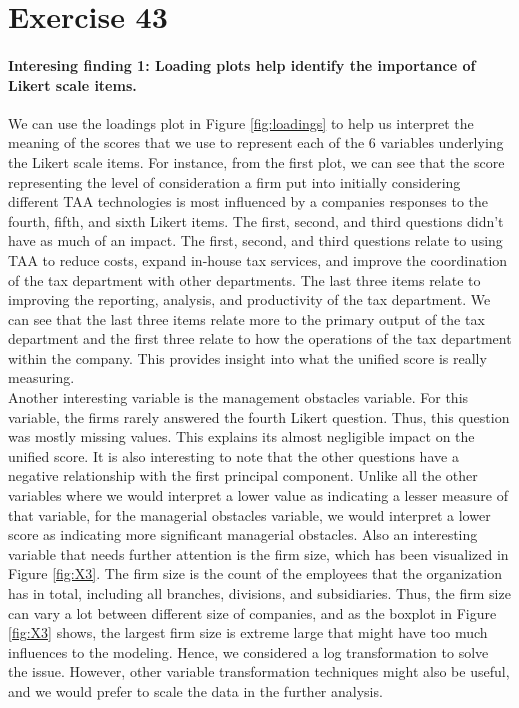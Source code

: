 \documentclass[12pt, letterpaper]{article}
\begin{document}
\section{Exercise 43}
\paragraph{Interesing finding 1: Loading plots help identify the importance of Likert scale items.}
We can use the loadings plot in Figure \ref{fig:loadings} to help us interpret the meaning of the scores that we use to represent each of the 6 variables underlying the Likert scale items. For instance, from the first plot, we can see that the score representing the level of consideration a firm put into initially considering different TAA technologies is most influenced by a companies responses to the fourth, fifth, and sixth Likert items. The first, second, and third questions didn't have as much of an impact. The first, second, and third questions relate to using TAA to reduce costs, expand in-house tax services, and improve the coordination of the tax department with other departments. The last three items relate to improving the reporting, analysis, and productivity of the tax department. We can see that the last three items relate more to the primary output of the tax department and the first three relate to how the operations of the tax department within the company. This provides insight into what the unified score is really measuring. \\

Another interesting variable is the management obstacles variable. For this variable, the firms rarely answered the fourth Likert question. Thus, this question was mostly missing values. This explains its almost negligible impact on the unified score. It is also interesting to note that the other questions have a negative relationship with the first principal component. Unlike all the other variables where we would interpret a lower value as indicating a lesser measure of that variable, for the managerial obstacles variable, we would interpret a lower score as indicating more significant managerial obstacles. 
Also an interesting variable that needs further attention is the firm size, which has been visualized in Figure \ref{fig:X3}. The firm size is the count of the employees that the organization has in total, including all branches, divisions, and subsidiaries. Thus, the firm size can vary a lot between different size of companies, and as the boxplot in Figure \ref{fig:X3} shows, the largest firm size is extreme large that might have too much influences to the modeling. Hence, we considered a log transformation to solve the issue. However, other variable transformation techniques might also be useful, and we would prefer to scale the data in the further analysis.
\end{document}
